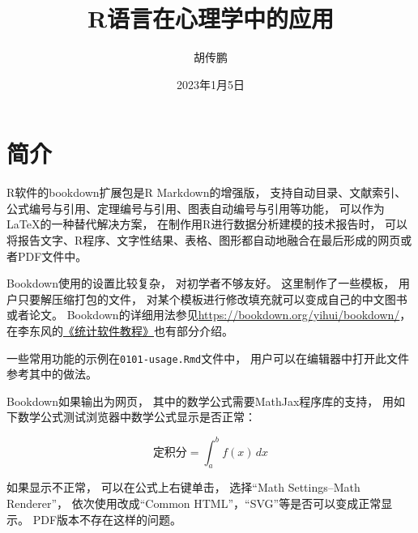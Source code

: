 \documentclass[
  oneside]{book}
\title{R语言在心理学中的应用}
\author{胡传鹏}
\date{2023年1月5日}
\begin{document}
\maketitle

{
\setcounter{tocdepth}{1}
\tableofcontents
}
\hypertarget{ux7b80ux4ecb}{%
\chapter*{简介}\label{ux7b80ux4ecb}}

R软件的bookdown扩展包是R Markdown的增强版，
支持自动目录、文献索引、公式编号与引用、定理编号与引用、图表自动编号与引用等功能，
可以作为LaTeX的一种替代解决方案，
在制作用R进行数据分析建模的技术报告时，
可以将报告文字、R程序、文字性结果、表格、图形都自动地融合在最后形成的网页或者PDF文件中。

Bookdown使用的设置比较复杂，
对初学者不够友好。
这里制作了一些模板，
用户只要解压缩打包的文件，
对某个模板进行修改填充就可以变成自己的中文图书或者论文。
Bookdown的详细用法参见\url{https://bookdown.org/yihui/bookdown/}，
在李东风的\href{http://www.math.pku.edu.cn/teachers/lidf/docs/Rbook/html/_Rbook/index.html}{《统计软件教程》}也有部分介绍。

一些常用功能的示例在\texttt{0101-usage.Rmd}文件中，
用户可以在编辑器中打开此文件参考其中的做法。

Bookdown如果输出为网页，
其中的数学公式需要MathJax程序库的支持，
用如下数学公式测试浏览器中数学公式显示是否正常：

\[
\text{定积分} = \int_a^b f(x) \,dx
\]

如果显示不正常，
可以在公式上右键单击，
选择``Math Settings--Math Renderer''，
依次使用改成``Common HTML''，``SVG''等是否可以变成正常显示。
PDF版本不存在这样的问题。

\printbibliography
\end{document}
